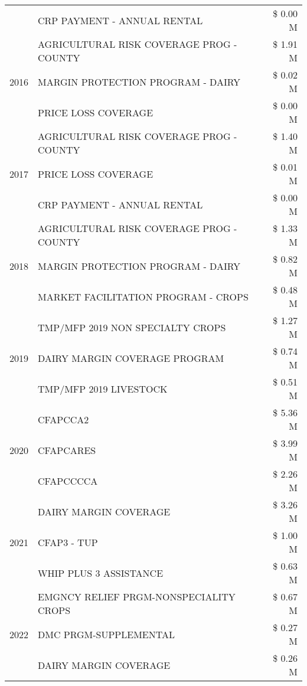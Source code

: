 \begin{tabular}{llr}
 & CRP PAYMENT - ANNUAL RENTAL & \$ 0.00 M \\
\cline{1-3}
\multirow[t]{3}{*}{2016} & AGRICULTURAL RISK COVERAGE PROG - COUNTY & \$ 1.91 M \\
 & MARGIN PROTECTION PROGRAM - DAIRY & \$ 0.02 M \\
 & PRICE LOSS COVERAGE & \$ 0.00 M \\
\cline{1-3}
\multirow[t]{3}{*}{2017} & AGRICULTURAL RISK COVERAGE PROG - COUNTY & \$ 1.40 M \\
 & PRICE LOSS COVERAGE & \$ 0.01 M \\
 & CRP PAYMENT - ANNUAL RENTAL & \$ 0.00 M \\
\cline{1-3}
\multirow[t]{3}{*}{2018} & AGRICULTURAL RISK COVERAGE PROG - COUNTY & \$ 1.33 M \\
 & MARGIN PROTECTION PROGRAM - DAIRY & \$ 0.82 M \\
 & MARKET FACILITATION PROGRAM - CROPS & \$ 0.48 M \\
\cline{1-3}
\multirow[t]{3}{*}{2019} & TMP/MFP 2019 NON SPECIALTY CROPS & \$ 1.27 M \\
 & DAIRY MARGIN COVERAGE PROGRAM & \$ 0.74 M \\
 & TMP/MFP 2019 LIVESTOCK & \$ 0.51 M \\
\cline{1-3}
\multirow[t]{3}{*}{2020} & CFAPCCA2 & \$ 5.36 M \\
 & CFAPCARES & \$ 3.99 M \\
 & CFAPCCCCA & \$ 2.26 M \\
\cline{1-3}
\multirow[t]{3}{*}{2021} & DAIRY MARGIN COVERAGE & \$ 3.26 M \\
 & CFAP3 - TUP & \$ 1.00 M \\
 & WHIP PLUS 3 ASSISTANCE & \$ 0.63 M \\
\cline{1-3}
\multirow[t]{3}{*}{2022} & EMGNCY RELIEF PRGM-NONSPECIALITY CROPS & \$ 0.67 M \\
 & DMC PRGM-SUPPLEMENTAL & \$ 0.27 M \\
 & DAIRY MARGIN COVERAGE & \$ 0.26 M \\
\cline{1-3}
\bottomrule
\end{tabular}
